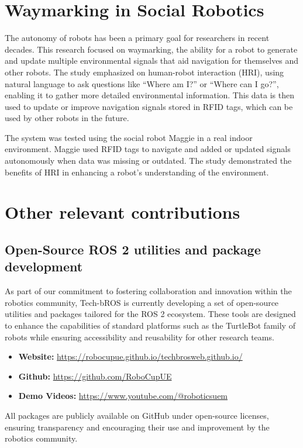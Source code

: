 \documentclass[runningheads,a4paper]{llncs}
\begin{document}
\section{Waymarking in Social Robotics}
The autonomy of robots has been a primary goal for researchers in recent decades. This research focused on waymarking, the ability for a robot to generate and  update multiple environmental signals that aid navigation for themselves and other robots. The study emphasized on human-robot interaction (HRI), using natural language to ask questions like “Where am I?” or “Where can I go?”, enabling it to gather more detailed environmental information. This data is then used to update or improve navigation signals stored in RFID tags, which can be used by other robots in the future.\cite{corrales2021embodiment}

The system was tested using the social robot Maggie in a real indoor environment. Maggie used RFID tags to navigate and added or updated signals autonomously when data was missing or outdated. The study demonstrated the benefits of HRI in enhancing a robot's understanding of the environment.

\section{Other relevant contributions}

\subsection{Open-Source ROS 2 utilities and package development}
As part of our commitment to fostering collaboration and innovation within the robotics community, Tech-bROS is currently developing a set of open-source utilities and packages tailored for the ROS 2 ecosystem. These tools are designed to enhance the capabilities of standard platforms such as the TurtleBot family of robots while ensuring accessibility and reusability for other research teams.

\begin{itemize}
    \item \textbf{Website:} \url{https://robocupue.github.io/techbrosweb.github.io/}
    \item \textbf{Github:} \url{https://github.com/RoboCupUE}
    \item \textbf{Demo Videos:} \url{https://www.youtube.com/@roboticsuem}
\end{itemize}

All packages are publicly available on GitHub under open-source licenses, ensuring transparency and encouraging their use and improvement by the robotics community.
\end{document}
